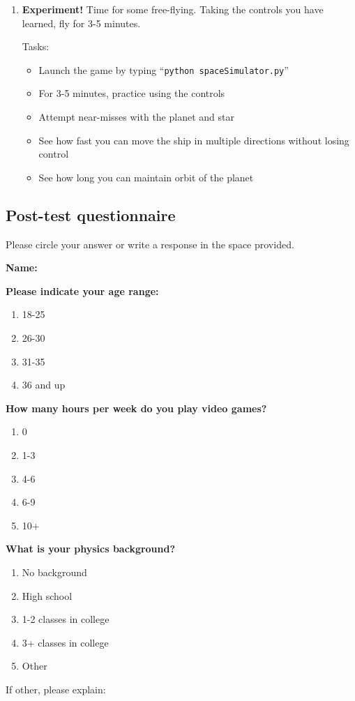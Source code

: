 \begin{enumerate}
  \item \textbf{Experiment!}  Time for some free-flying.  Taking the controls you have learned, fly for 3-5 minutes. 
  
  Tasks:
  \begin{itemize}
    \item Launch the game by typing ``\texttt{python spaceSimulator.py}''
    \item For 3-5 minutes, practice using the controls
    \item Attempt near-misses with the planet and star
    \item See how fast you can move the ship in multiple directions without losing control
    \item See how long you can maintain orbit of the planet
  \end{itemize}

\end{enumerate}

\subsection{Post-test questionnaire}

Please circle your answer or write a response in the space provided.

\vspace{5mm}
\noindent\textbf{Name:}

\vspace{5mm}
\noindent\textbf{Please indicate your age range:}
\begin{enumerate}
  \item 18-25
  \item 26-30
  \item 31-35
  \item 36 and up
\end{enumerate}

\vspace{5mm}
\noindent\textbf{How many hours per week do you play video games?}
\begin{enumerate}
  \item 0
  \item 1-3
  \item 4-6
  \item 6-9
  \item 10+
\end{enumerate}

\vspace{5mm}
\noindent\textbf{What is your physics background?}
\begin{enumerate}
  \item No background
  \item High school
  \item 1-2 classes in college
  \item 3+ classes in college
  \item Other
\end{enumerate}
If other, please explain:

